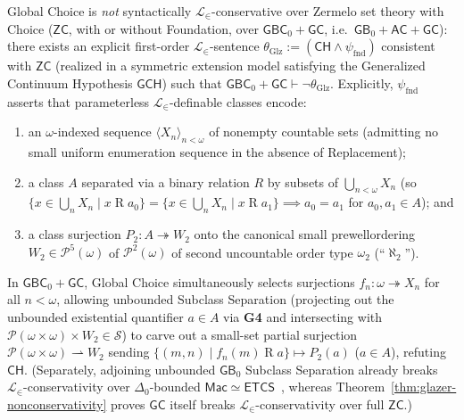 \begin{theorem}\label{thm:glazer-nonconservativity}%
%
Global Choice is \emph{not} syntactically $\mathcal{L}_\in$-conservative over Zermelo set theory with Choice ($\mathsf{ZC}$, with or without Foundation, over $\mathsf{GBC}_0 + \mathsf{GC}$, i.e.\ $\mathsf{GB}_0 + \mathsf{AC} + \mathsf{GC}$): there exists an explicit first-order $\mathcal{L}_\in$-sentence $\theta_{\mathrm{Glz}} := (\mathsf{CH} \wedge \psi_{\mathrm{fnd}})$ consistent with $\mathsf{ZC}$ (realized in a symmetric extension model satisfying the Generalized Continuum Hypothesis $\mathsf{GCH}$) such that $\mathsf{GBC}_0 + \mathsf{GC} \vdash \neg\theta_{\mathrm{Glz}}$. Explicitly, $\psi_{\mathrm{fnd}}$ asserts that parameterless $\mathcal{L}_\in$-definable classes encode:
\begin{enumerate}
  \item an $\omega$-indexed sequence $\langle X_n \rangle_{n < \omega}$ of nonempty countable sets (admitting no small uniform enumeration sequence in the absence of Replacement);
  \item a class $A$ separated via a binary relation $R$ by subsets of $\bigcup_{n < \omega} X_n$ (so $\{x \in \bigcup_n X_n \mid x \mathrel{R} a_0\} = \{x \in \bigcup_n X_n \mid x \mathrel{R} a_1\} \implies a_0 = a_1$ for $a_0, a_1 \in A$); and
  \item a class surjection $P_2 : A \twoheadrightarrow W_2$ onto the canonical small prewellordering $W_2 \in \mathcal{P}^5(\omega)$ of $\mathcal{P}^2(\omega)$ of second uncountable order type $\omega_2$ (``$\aleph_2$'').
\end{enumerate}
In $\mathsf{GBC}_0 + \mathsf{GC}$, Global Choice simultaneously selects surjections $f_n : \omega \twoheadrightarrow X_n$ for all $n < \omega$, allowing unbounded Subclass Separation (projecting out the unbounded existential quantifier $a \in A$ via \textbf{G4} and intersecting with $\mathcal{P}(\omega \times \omega) \times W_2 \in \mathcal{S}$) to carve out a small-set partial surjection $\mathcal{P}(\omega \times \omega) \rightharpoonup W_2$ sending $\{(m, n) \mid f_n(m) \mathrel{R} a\} \mapsto P_2(a)$ ($a \in A$), refuting $\mathsf{CH}$. (Separately, adjoining unbounded $\mathsf{GB}_0$ Subclass Separation already breaks $\mathcal{L}_\in$-conservativity over $\Delta_0$-bounded $\mathsf{Mac} \simeq \mathsf{ETCS}$~\cite{Mathias01}, whereas Theorem~\ref{thm:glazer-nonconservativity} proves $\mathsf{GC}$ itself breaks $\mathcal{L}_\in$-conservativity over full $\mathsf{ZC}$.)
\end{theorem}

